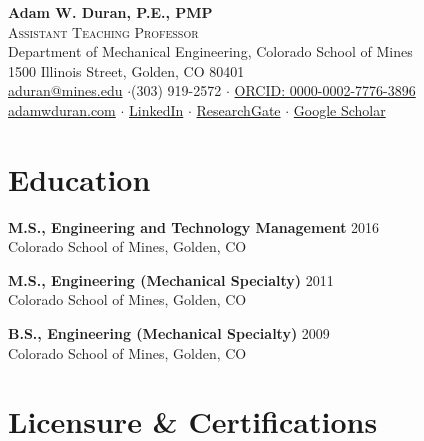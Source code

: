 \documentclass[11pt,letterpaper]{article}
\begin{document}
\thispagestyle{plain}

\begin{center}
  {\LARGE\bfseries Adam W. Duran, P.E., PMP}\\[4pt]
  \textsc{Assistant Teaching Professor}\\[2pt]
  Department of Mechanical Engineering, Colorado School of Mines\\
  1500 Illinois Street, Golden, CO 80401\\[4pt]
  \href{mailto:aduran@mines.edu}{aduran@mines.edu}
  \quad$\cdot$\quad (303) 919-2572
  \quad$\cdot$\quad
  \href{https://orcid.org/0000-0002-7776-3896}{ORCID: 0000-0002-7776-3896}\\
  \href{https://adamwduran.com}{adamwduran.com}
  \quad$\cdot$\quad
  \href{https://www.linkedin.com/in/adamduran/}{LinkedIn}
  \quad$\cdot$\quad
  \href{https://www.researchgate.net/profile/Adam-Duran-2}{ResearchGate}
  \quad$\cdot$\quad
  \href{https://scholar.google.com/citations?user=BQ404mAAAAAJ}{Google Scholar}
\end{center}

\vspace{6pt}

\section{Education}


\medskip
\noindent\textbf{M.S., Engineering and Technology Management} \hfill 2016\\
Colorado School of Mines, Golden, CO

\medskip
\noindent\textbf{M.S., Engineering (Mechanical Specialty)} \hfill 2011\\
Colorado School of Mines, Golden, CO

\medskip
\noindent\textbf{B.S., Engineering (Mechanical Specialty)} \hfill 2009\\
Colorado School of Mines, Golden, CO

\section{Licensure \& Certifications}
\end{document}
